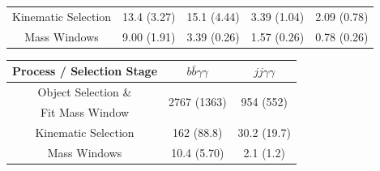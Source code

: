 \begin{table}[!ht]
\begin{center}
{\begin{tabular}{|c|c|c|c|c|}
Kinematic Selection                  &  13.4 (3.27)                             &  15.1  (4.44)                            &  3.39  (1.04)                                        &  2.09 (0.78)       \\ 
Mass Windows                         &  9.00 (1.91)                              &  3.39  (0.26)                            &  1.57 (0.26)                                         &  0.78 (0.26)       \\  \hline
\end{tabular}
}
\vspace{2mm}
\begin{tabular}{|c|c|c|}
\hline
Process / Selection Stage           &  $b \bar{b} \gamma\gamma$   & $jj \gamma\gamma$            \\  \hline
Object Selection \&                 &  \multirow{2}{*}{2767 (1363)} & \multirow{2}{*}{954 (552)} \\ 
Fit Mass Window                     &                             &                              \\ 
Kinematic Selection                 &  162  (88.8)                 &  30.2  (19.7)                      \\ 
Mass Windows                        &  10.4 (5.70)                &  2.1 (1.2)                     \\  \hline
\end{tabular}
\vspace{2mm}
\end{center}
\end{table}
